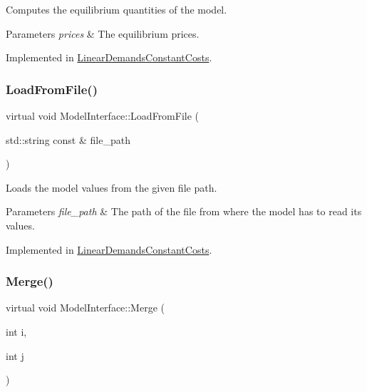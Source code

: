 Computes the equilibrium quantities of the model.


\begin{DoxyParams}{Parameters}
{\em prices} & The equilibrium prices. \\
\hline
\end{DoxyParams}


Implemented in \hyperlink{classLinearDemandsConstantCosts_a310864e458935098502561540a71a88c}{Linear\+Demands\+Constant\+Costs}.

\mbox{\label{classModelInterface_a7f408fdb15c10ce8cabf6b942bbc9c38}} 
\subsubsection{\texorpdfstring{Load\+From\+File()}{LoadFromFile()}}
{\footnotesize\ttfamily virtual void Model\+Interface\+::\+Load\+From\+File (\begin{DoxyParamCaption}\item[{std\+::string const \&}]{file\+\_\+path }\end{DoxyParamCaption})\hspace{0.3cm}{\ttfamily [pure virtual]}}

Loads the model values from the given file path.


\begin{DoxyParams}{Parameters}
{\em file\+\_\+path} & The path of the file from where the model has to read its values. \\
\hline
\end{DoxyParams}


Implemented in \hyperlink{classLinearDemandsConstantCosts_a075add461e368629b9dfd8f72033e2ad}{Linear\+Demands\+Constant\+Costs}.

\mbox{\label{classModelInterface_a9aa52643da1fe9e74750e31a6c6ec469}} 
\subsubsection{\texorpdfstring{Merge()}{Merge()}}
{\footnotesize\ttfamily virtual void Model\+Interface\+::\+Merge (\begin{DoxyParamCaption}\item[{int}]{i,  }\item[{int}]{j }\end{DoxyParamCaption})\hspace{0.3cm}{\ttfamily [pure virtual]}}

